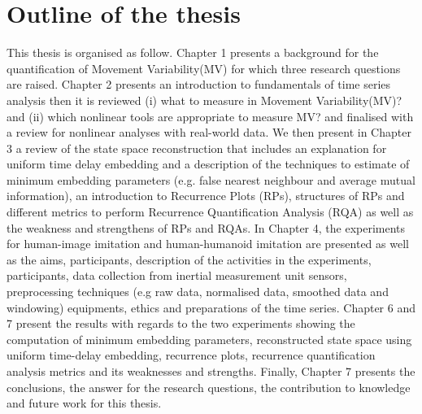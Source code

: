 \section{Outline of the thesis}

This thesis is organised as follow. 
Chapter 1 presents a background for the quantification of 
Movement Variability(MV) for which three research questions are raised.
Chapter 2 presents an introduction to fundamentals of time series
analysis then it is reviewed (i) what to measure in Movement Variability(MV)?
and (ii) which nonlinear tools are appropriate to measure MV? and
finalised with a review for nonlinear analyses with real-world data.
We then present in Chapter 3 a review of the state space 
reconstruction that includes an explanation for uniform time delay embedding 
and a description of the techniques to estimate of minimum embedding 
parameters (e.g. false nearest neighbour and average mutual information),
an introduction to Recurrence Plots (RPs),
structures of RPs and different metrics to perform 
Recurrence Quantification Analysis (RQA) as well as the 
weakness and strengthens of RPs and RQAs.
In Chapter 4, the experiments for human-image imitation and human-humanoid 
imitation are presented as well as the aims, participants, description 
of the activities in the experiments, participants, data collection 
from inertial measurement unit sensors, preprocessing techniques 
(e.g raw data, normalised data, smoothed data and windowing) 
equipments, ethics and preparations of the time series.
Chapter 6 and 7 present the results with regards to the two experiments
showing the computation of minimum embedding parameters, 
reconstructed state space using uniform time-delay embedding, 
recurrence plots, recurrence quantification analysis metrics and
its weaknesses and strengths.
Finally, Chapter 7 presents the conclusions, the answer for the
research questions, the contribution to knowledge and future work
for this thesis.

